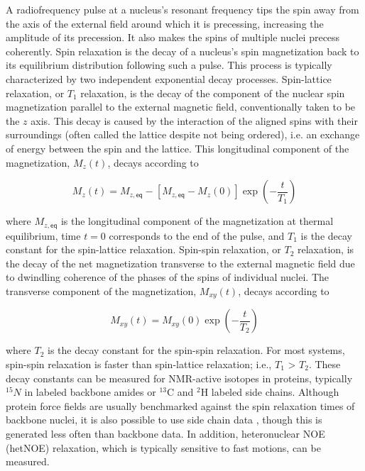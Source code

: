 \documentclass[9pt,review]{livecoms}
\begin{document}
A radiofrequency pulse at a nucleus’s resonant frequency tips the spin away from the axis of the external field around which it is precessing, increasing the amplitude of its precession.
It also makes the spins of multiple nuclei precess coherently.
Spin relaxation is the decay of a nucleus’s spin magnetization back to its equilibrium distribution following such a pulse.
This process is typically characterized by two independent exponential decay processes.
Spin-lattice relaxation, or $T_1$ relaxation, is the decay of the component of the nuclear spin magnetization parallel to the external magnetic field, conventionally taken to be the $z$ axis.
This decay is caused by the interaction of the aligned spins with their surroundings (often called the lattice despite not being ordered), i.e. an exchange of energy between the spin and the lattice.
This longitudinal component of the magnetization, $M_z(t)$, decays according to

\begin{equation}
\label{eqn:t1_relax}
M_z(t) = M_{z,\mathsf{eq}} - [M_{z,\mathsf{eq}} - M_z(0)] \exp \left( -\frac {t} {T_1} \right)
\end{equation}

\noindent where $M_{z,\mathsf{eq}}$ is the longitudinal component of the magnetization at thermal equilibrium, time $t = 0$ corresponds to the end of the pulse, and $T_1$ is the decay constant for the spin-lattice relaxation.
Spin-spin relaxation, or $T_2$ relaxation, is the decay of the net magnetization transverse to the external magnetic field due to dwindling coherence of the phases of the spins of individual nuclei. The transverse component of the magnetization, $M_{xy}(t)$, decays according to

\begin{equation}
\label{eqn:t2_relax}
M_{xy}(t) = M_{xy}(0) \exp \left( -\frac {t} {T_2} \right)
\end{equation}

\noindent where $T_2$ is the decay constant for the spin-spin relaxation.
For most systems, spin-spin relaxation is faster than spin-lattice relaxation; i.e., $T_1$ > $T_2$.
These decay constants can be measured for NMR-active isotopes in proteins, typically $^{15}N$ in labeled backbone amides or $^{13}$C and $^2$H labeled side chains.
Although protein force fields are usually benchmarked against the spin relaxation times of backbone nuclei, it is also possible to use side chain data \cite{hoffmann_accurate_2018}, though this is generated less often than backbone data.
In addition, heteronuclear NOE (hetNOE) relaxation, which is typically sensitive to fast motions, can be measured.
\end{document}
